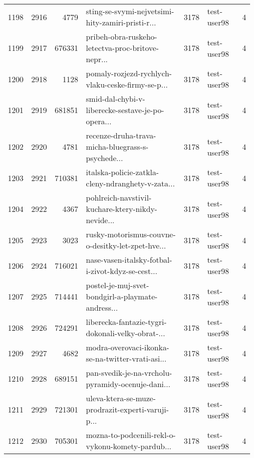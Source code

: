 \begin{tabular}{lrrlrlr}
1198 &       2916 &     4779 &  sting-se-svymi-nejvetsimi-hity-zamiri-pristi-r... &     3178 &                  test-user98 &               4 \\
1199 &       2917 &   676331 &  pribeh-obra-ruskeho-letectva-proc-britove-nepr... &     3178 &                  test-user98 &               4 \\
1200 &       2918 &     1128 &  pomaly-rozjezd-rychlych-vlaku-ceske-firmy-se-p... &     3178 &                  test-user98 &               4 \\
1201 &       2919 &   681851 &  smid-dal-chybi-v-liberecke-sestave-je-po-opera... &     3178 &                  test-user98 &               4 \\
1202 &       2920 &     4781 &  recenze-druha-trava-micha-bluegrass-s-psychede... &     3178 &                  test-user98 &               4 \\
1203 &       2921 &   710381 &  italska-policie-zatkla-cleny-ndranghety-v-zata... &     3178 &                  test-user98 &               4 \\
1204 &       2922 &     4367 &  pohlreich-navstivil-kuchare-ktery-nikdy-nevide... &     3178 &                  test-user98 &               4 \\
1205 &       2923 &     3023 &  rusky-motorismus-couvne-o-desitky-let-zpet-hve... &     3178 &                  test-user98 &               4 \\
1206 &       2924 &   716021 &  nase-vasen-italsky-fotbal-i-zivot-kdyz-se-cest... &     3178 &                  test-user98 &               4 \\
1207 &       2925 &   714441 &  postel-je-muj-svet-bondgirl-a-playmate-andress... &     3178 &                  test-user98 &               4 \\
1208 &       2926 &   724291 &  liberecka-fantazie-tygri-dokonali-velky-obrat-... &     3178 &                  test-user98 &               4 \\
1209 &       2927 &     4682 &  modra-overovaci-ikonka-se-na-twitter-vrati-asi... &     3178 &                  test-user98 &               4 \\
1210 &       2928 &   689151 &  pan-svedik-je-na-vrcholu-pyramidy-ocenuje-dani... &     3178 &                  test-user98 &               4 \\
1211 &       2929 &   721301 &  uleva-ktera-se-muze-prodrazit-experti-varuji-p... &     3178 &                  test-user98 &               4 \\
1212 &       2930 &   705301 &  mozna-to-podcenili-rekl-o-vykonu-komety-pardub... &     3178 &                  test-user98 &               4 \\

\end{tabular}
